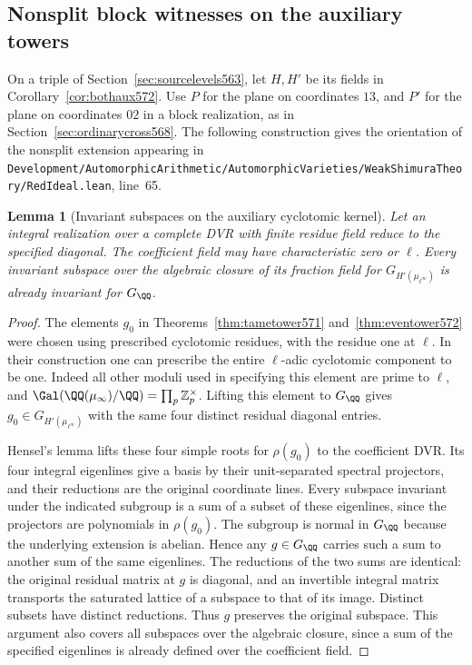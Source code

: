 \documentclass[a4paper,11pt]{article}
\newtheorem{lemma}[proposition]{Lemma}
\theoremstyle{definition}
\theoremstyle{remark}
\newcommand{\ZZ}{\mathbb Z}\newcommand{\ord}{\operatorname{ord}}
\newcommand{\srcloc}[2]{{\small\nolinkurl{#1.lean}}, line~#2}
\numberwithin{equation}{section}
\begin{document}
\subsection{Nonsplit block witnesses on the auxiliary towers}
\label{sec:blockwitness575}

On a triple of Section~\ref{sec:sourcelevels563}, let \(H,H'\)
be its fields in Corollary~\ref{cor:bothaux572}. Use \(P\)
for the plane on coordinates \(13\), and \(P'\) for the plane
on coordinates \(02\) in a block realization, as in
Section~\ref{sec:ordinarycross568}. The following construction
gives the orientation of the nonsplit extension appearing in
\srcloc{Development/AutomorphicArithmetic/AutomorphicVarieties/WeakShimuraTheory/RedIdeal}{65}.

\begin{lemma}[Invariant subspaces on the auxiliary cyclotomic kernel]
\leavevmode\label{lem:cyclospaces575}
Let an integral realization over a complete DVR with finite
residue field reduce to the specified diagonal. The coefficient
field may have characteristic zero or \(\ell\). Every invariant
subspace over the algebraic closure of its fraction field for
\(G_{H'(\mu_{\ell^\infty})}\) is already invariant for \(G_\QQ\).
\end{lemma}
\begin{proof}
The elements \(g_0\) in Theorems~\ref{thm:tametower571}
and~\ref{thm:eventower572} were chosen using prescribed
cyclotomic residues, with the residue one at \(\ell\).
In their construction one can prescribe the entire
\(\ell\)-adic cyclotomic component to be one. Indeed all
other moduli used in specifying this element are prime
to \(\ell\), and
\(\Gal(\QQ(\mu_\infty)/\QQ)=\prod_p\ZZ_p^\times\).
Lifting this element to \(G_\QQ\) gives
\(g_0\in G_{H'(\mu_{\ell^\infty})}\) with the same four
distinct residual diagonal entries.

Hensel's lemma lifts these four simple roots for \(\rho(g_0)\)
to the coefficient DVR. Its four integral eigenlines give
a basis by their unit-separated spectral projectors, and
their reductions are the original coordinate lines. Every
subspace invariant under the indicated subgroup is a sum
of a subset of these eigenlines, since the projectors are
polynomials in \(\rho(g_0)\). The subgroup is normal in
\(G_\QQ\) because the underlying extension is abelian.
Hence any \(g\in G_\QQ\) carries such a sum to another sum
of the same eigenlines. The reductions of the two sums
are identical: the original residual matrix at \(g\) is
diagonal, and an invertible integral matrix transports
the saturated lattice of a subspace to that of its image.
Distinct subsets have distinct reductions. Thus \(g\)
preserves the original subspace. This argument also covers
all subspaces over the algebraic closure, since a sum of
the specified eigenlines is already defined over the
coefficient field.
\end{proof}
\end{document}
